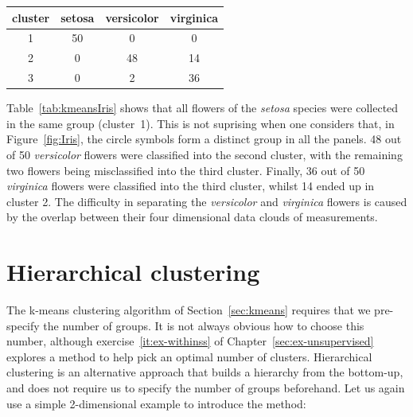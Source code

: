 \begin{center}
  \begin{tabular}{c|ccc}
    cluster & setosa & versicolor & virginica \\ \hline
    1 & 50 & 0 & 0 \\
    2 & 0 & 48 & 14 \\
    3 & 0 & 2 & 36 
  \end{tabular}
  \label{tab:kmeansIris}
\end{center}

Table~\ref{tab:kmeansIris} shows that all flowers of the \emph{setosa}
species were collected in the same group (cluster~1). This is not
suprising when one considers that, in Figure~\ref{fig:Iris}, the
circle symbols form a distinct group in all the panels. 48 out of 50
\emph{versicolor} flowers were classified into the second cluster,
with the remaining two flowers being misclassified into the third
cluster. Finally, 36 out of 50 \emph{virginica} flowers were
classified into the third cluster, whilst 14 ended up in cluster 2.
The difficulty in separating the \emph{versicolor} and
\emph{virginica} flowers is caused by the overlap between their four
dimensional data clouds of measurements.

\section{Hierarchical clustering}
\label{sec:hierarchical}

The k-means clustering algorithm of Section~\ref{sec:kmeans} requires
that we pre-specify the number of groups.  It is not always obvious
how to choose this number, although exercise~\ref{it:ex-withinss} of
Chapter~\ref{sec:ex-unsupervised} explores a method to help pick an
optimal number of clusters.  Hierarchical clustering is an alternative
approach that builds a hierarchy from the bottom-up, and does not
require us to specify the number of groups beforehand. Let us again
use a simple 2-dimensional example to introduce the method:

